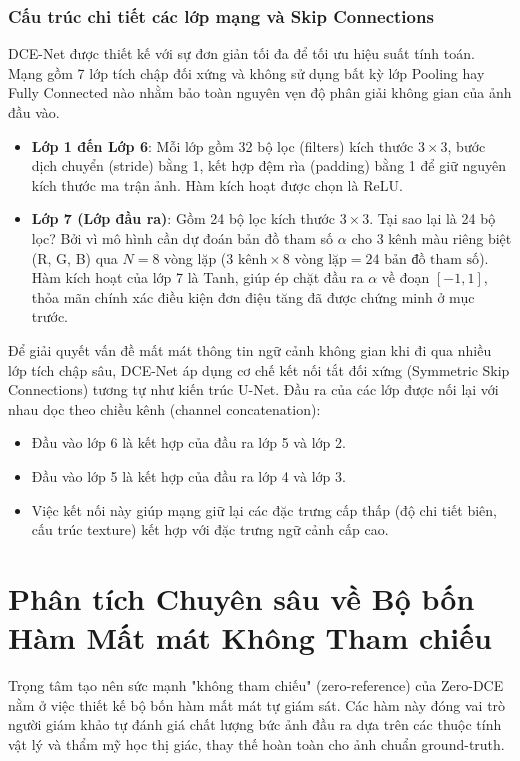 \documentclass[a4paper]{article}
\begin{document}
\subsubsection{Cấu trúc chi tiết các lớp mạng và Skip Connections}
DCE-Net được thiết kế với sự đơn giản tối đa để tối ưu hiệu suất tính toán. Mạng gồm 7 lớp tích chập đối xứng và không sử dụng bất kỳ lớp Pooling hay Fully Connected nào nhằm bảo toàn nguyên vẹn độ phân giải không gian của ảnh đầu vào.
\begin{itemize}
    \item \textbf{Lớp 1 đến Lớp 6}: Mỗi lớp gồm 32 bộ lọc (filters) kích thước $3 \times 3$, bước dịch chuyển (stride) bằng 1, kết hợp đệm rìa (padding) bằng 1 để giữ nguyên kích thước ma trận ảnh. Hàm kích hoạt được chọn là ReLU.
    \item \textbf{Lớp 7 (Lớp đầu ra)}: Gồm 24 bộ lọc kích thước $3 \times 3$. Tại sao lại là 24 bộ lọc? Bởi vì mô hình cần dự đoán bản đồ tham số $\alpha$ cho 3 kênh màu riêng biệt (R, G, B) qua $N=8$ vòng lặp ($3 \text{ kênh} \times 8 \text{ vòng lặp} = 24 \text{ bản đồ tham số}$). Hàm kích hoạt của lớp 7 là Tanh, giúp ép chặt đầu ra $\alpha$ về đoạn $[-1, 1]$, thỏa mãn chính xác điều kiện đơn điệu tăng đã được chứng minh ở mục trước.
\end{itemize}

Để giải quyết vấn đề mất mát thông tin ngữ cảnh không gian khi đi qua nhiều lớp tích chập sâu, DCE-Net áp dụng cơ chế kết nối tắt đối xứng (Symmetric Skip Connections) tương tự như kiến trúc U-Net. Đầu ra của các lớp được nối lại với nhau dọc theo chiều kênh (channel concatenation):
\begin{itemize}
    \item Đầu vào lớp 6 là kết hợp của đầu ra lớp 5 và lớp 2.
    \item Đầu vào lớp 5 là kết hợp của đầu ra lớp 4 và lớp 3.
    \item Việc kết nối này giúp mạng giữ lại các đặc trưng cấp thấp (độ chi tiết biên, cấu trúc texture) kết hợp với đặc trưng ngữ cảnh cấp cao.
\end{itemize}

\clearpage

\section{Phân tích Chuyên sâu về Bộ bốn Hàm Mất mát Không Tham chiếu}

Trọng tâm tạo nên sức mạnh "không tham chiếu" (zero-reference) của Zero-DCE nằm ở việc thiết kế bộ bốn hàm mất mát tự giám sát. Các hàm này đóng vai trò người giám khảo tự đánh giá chất lượng bức ảnh đầu ra dựa trên các thuộc tính vật lý và thẩm mỹ học thị giác, thay thế hoàn toàn cho ảnh chuẩn ground-truth.
\end{document}
